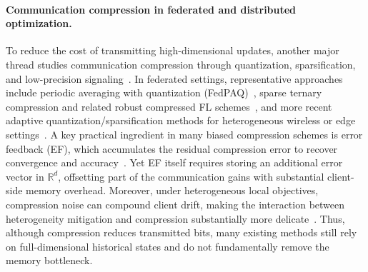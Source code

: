 \paragraph{Communication compression in federated and distributed optimization.}
To reduce the cost of transmitting high-dimensional updates, another major thread studies communication compression through quantization, sparsification, and low-precision signaling~\cite{alistarh2017qsgd,bernstein2018signsgd,bernstein2019majority,lin2018deep,stich2018memory,mishchenko2019diana,khirirat2019memory,stich2020heterogeneous,sahu2021rethinking,condat2022efbv}. In federated settings, representative approaches include periodic averaging with quantization (FedPAQ)~\cite{reisizadeh2020fedpaq}, sparse ternary compression and related robust compressed FL schemes~\cite{sattler2020robust,xu2021ternary,mora2022structured}, and more recent adaptive quantization/sparsification methods for heterogeneous wireless or edge settings~\cite{makarenko2022adaptive,zakerinia2022communication,marnissi2024adaptive,oh2024overtheair,bao2025efskip}. A key practical ingredient in many biased compression schemes is error feedback (EF), which accumulates the residual compression error to recover convergence and accuracy~\cite{stich2018memory,khirirat2019memory,condat2022efbv}. Yet EF itself requires storing an additional error vector in $\mathbb{R}^d$, offsetting part of the communication gains with substantial client-side memory overhead. Moreover, under heterogeneous local objectives, compression noise can compound client drift, making the interaction between heterogeneity mitigation and compression substantially more delicate~\cite{stich2020heterogeneous,zakerinia2022communication,bao2025efskip}. Thus, although compression reduces transmitted bits, many existing methods still rely on full-dimensional historical states and do not fundamentally remove the memory bottleneck.

